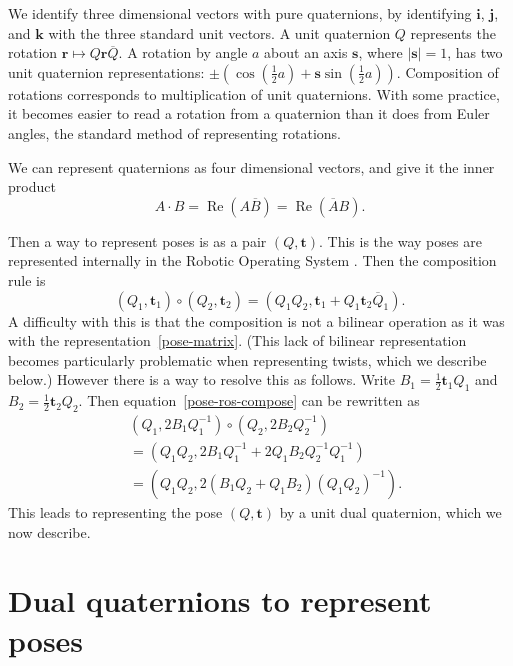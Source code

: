 \documentclass[reqno,12pt]{amsart}
\newcommand\bi{\bm i}
\newcommand\bj{\bm j}
\newcommand\bk{\bm k}
\DeclareMathOperator\realpart{Re}
\begin{document}
We identify three dimensional vectors with pure quaternions, by identifying $\bi$, $\bj$, and $\bk$ with the three standard unit vectors.  A unit quaternion $Q$ represents the rotation $\bm r \mapsto Q \bm r \overline Q$.  A rotation by angle $a$ about an axis $\bm s$, where $|\bm s| = 1$, has two unit quaternion representations: $\pm(\cos(\tfrac12 a) + \bm s \sin(\tfrac12 a))$.  Composition of rotations corresponds to multiplication of unit quaternions.  With some practice, it becomes easier to read a rotation from a quaternion than it does from Euler angles, the standard method of representing rotations.

We can represent quaternions as four dimensional vectors, and give it the inner product
\begin{equation}
A \cdot B = \realpart(A \overline B) = \realpart(\overline A B) .
\end{equation}

Then a way to represent poses is as a pair $(Q,\bm t)$.  This is the way poses are represented internally in the Robotic Operating System \cite{ros}.  Then the composition rule is
\begin{equation}
\label{pose-ros-compose}
(Q_1, \bm t_1) \circ (Q_2, \bm t_2) = (Q_1 Q_2, \bm t_1 + Q_1 \bm t_2 \overline Q_1).
\end{equation}
A difficulty with this is that the composition is not a bilinear operation as it was with the representation~\eqref{pose-matrix}.  (This lack of bilinear representation becomes particularly problematic when representing twists, which we describe below.)  However there is a way to resolve this as follows.  Write $B_1 = \tfrac12 \bm t_1 Q_1$ and $B_2 = \tfrac12 \bm t_2 Q_2$.  Then equation~\eqref{pose-ros-compose} can be rewritten as
\begin{equation}
\begin{aligned}
& (Q_1, 2 B_1 Q_1^{-1}) \circ (Q_2, 2 B_2 Q_2^{-1}) 
\\& = (Q_1 Q_2, 2 B_1 Q_1^{-1}+ 2 Q_1 B_2 Q_2^{-1} Q_1^{-1})
\\& = (Q_1 Q_2, 2 (B_1 Q_2 + Q_1 B_2)(Q_1 Q_2)^{-1}) .
\end{aligned}
\end{equation}
This leads to representing the pose $(Q,\bm t)$ by a unit dual quaternion, which we now describe.

\section{Dual quaternions to represent poses}
\label{sec poses}
\end{document}
